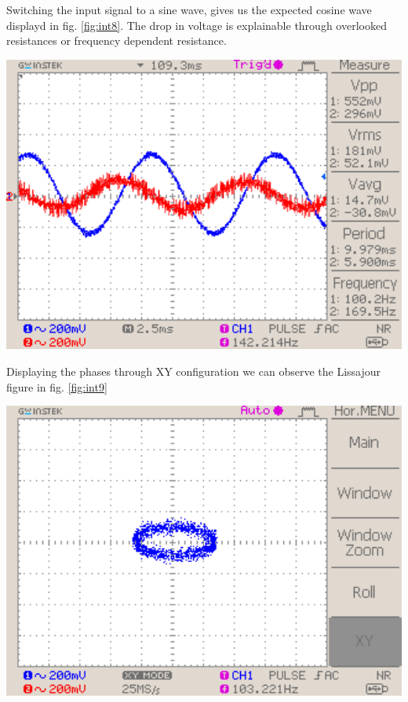 \documentclass[a4paper,10pt]{article}
\newenvironment{Figure}
        {\par\medskip\noindent\minipage{\linewidth}}
        {\endminipage\par\medskip}
\numberwithin{equation}{section}
\begin{document}
\begin{multicols}{2}
	Switching the input signal to a sine wave, gives us the expected cosine wave displayd in fig. \ref{fig:int8}. The drop in voltage is explainable through overlooked resistances or frequency dependent resistance.
	\begin{Figure}
		\centering
		\includegraphics[width=1\textwidth]{../data/DS0041_n.png}
		\label{fig:int8}
	\end{Figure}
	Displaying the phases through XY configuration we can observe the Lissajour figure in fig. \ref{fig:int9}
	\begin{Figure}
		\centering
		\includegraphics[width=1\textwidth]{../data/DS0040_n.png}
		\label{fig:int9}
	\end{Figure}


\end{multicols}
\end{document}
